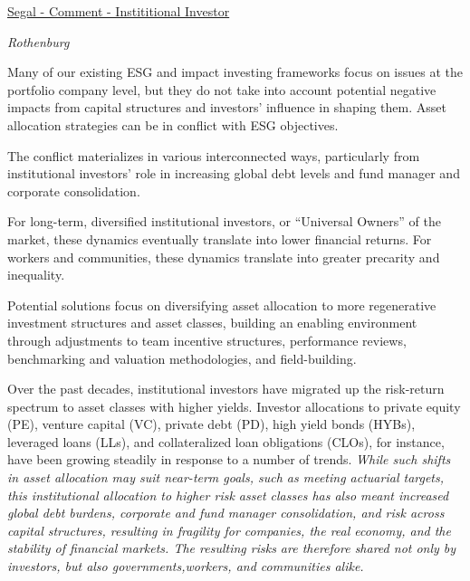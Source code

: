 \documentclass[
]{book}
\begin{document}
\href{https://www.institutionalinvestor.com/article/b1r9js87jhyn8s/How-Institutional-Investors-Encourage-Corporations-Bad-Behavior}{Segal - Comment - Instititional Investor}

\emph{Rothenburg}

Many of our existing ESG and impact investing frameworks focus on issues at the
portfolio company level, but they do not take into account potential negative
impacts from capital structures and investors' influence in shaping them.
Asset allocation strategies can be in conflict with ESG objectives.

The conflict materializes in various interconnected ways, particularly from
institutional investors' role in increasing global debt levels and
fund manager and corporate consolidation.

For long-term, diversified institutional investors, or ``Universal Owners''
of the market, these dynamics eventually translate into lower financial returns.
For workers and communities, these dynamics translate into
greater precarity and inequality.

Potential solutions focus on diversifying asset allocation to
more regenerative investment structures and asset classes, building an
enabling environment through adjustments to team incentive structures, performance reviews,
benchmarking and valuation methodologies, and field-building.

Over the past decades, institutional investors have migrated up
the risk-return spectrum to asset classes with higher yields.
Investor allocations to private equity (PE), venture capital (VC), private debt (PD),
high yield bonds (HYBs), leveraged loans (LLs), and
collateralized loan obligations (CLOs), for instance,
have been growing steadily in response to a number of trends.
\emph{While such shifts in asset allocation may suit near-term goals,
such as meeting actuarial targets, this institutional allocation to higher risk asset
classes has also meant increased global debt burdens, corporate and
fund manager consolidation, and risk across capital structures,
resulting in fragility for companies, the real economy, and the stability of
financial markets.
The resulting risks are therefore shared not only by investors,
but also governments,workers, and communities alike.}
\end{document}
